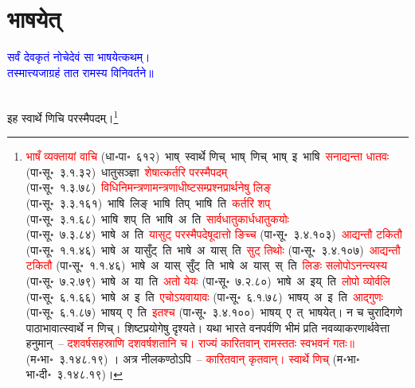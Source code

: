 \section[भाषयेत्]{भाषयेत्}
\centering\textcolor{blue}{सर्वं देवकृतं नोचेदेवं सा भाषयेत्कथम्।\nopagebreak\\
तस्मात्त्यजाग्रहं तात रामस्य विनिवर्तने॥}\nopagebreak\\
\\
\fontsize{14}{21}\selectfont\begin{sloppypar}\justifying\noindent\hspace{10mm} इह स्वार्थे णिचि परस्मैपदम्।\footnote{ \textcolor{red}{भाषँ व्यक्तायां वाचि} (धा॰पा॰~६१२)~\arrow भाष्~\arrow स्वार्थे णिच्~\arrow भाष्~णिच्~\arrow भाष्~इ~\arrow भाषि~\arrow \textcolor{red}{सनाद्यन्ता धातवः} (पा॰सू॰~३.१.३२)~\arrow धातु\-सञ्ज्ञा~\arrow \textcolor{red}{शेषात्कर्तरि परस्मैपदम्} (पा॰सू॰~१.३.७८)~\arrow \textcolor{red}{विधि\-निमन्‍त्रणामन्‍त्रणाधीष्‍ट\-सम्प्रश्‍न\-प्रार्थनेषु लिङ्} (पा॰सू॰~३.३.१६१)~\arrow भाषि~लिङ्~\arrow भाषि~तिप्~\arrow भाषि~ति~\arrow \textcolor{red}{कर्तरि शप्‌} (पा॰सू॰~३.१.६८)~\arrow भाषि~शप्~ति~\arrow भाषि~अ~ति~\arrow \textcolor{red}{सार्वधातुकार्ध\-धातुकयोः} (पा॰सू॰~७.३.८४)~\arrow भाषे~अ~ति~\arrow \textcolor{red}{यासुट् परस्मैपदेषूदात्तो ङिच्च} (पा॰सू॰~३.४.१०३)~\arrow \textcolor{red}{आद्यन्तौ टकितौ} (पा॰सू॰~१.१.४६)~\arrow भाषे~अ~यासुँट्~ति~\arrow भाषे~अ~यास्~ति~\arrow \textcolor{red}{सुट् तिथोः} (पा॰सू॰~३.४.१०७)~\arrow \textcolor{red}{आद्यन्तौ टकितौ} (पा॰सू॰~१.१.४६)~\arrow भाषे~अ~यास्~सुँट्~ति~\arrow भाषे~अ~यास्~स्~ति~\arrow \textcolor{red}{लिङः सलोपोऽनन्त्यस्य} (पा॰सू॰~७.२.७९)~\arrow भाषे~अ~या~ति~\arrow\textcolor{red}{अतो येयः} (पा॰सू॰~७.२.८०)~\arrow भाषे~अ~इय्~ति~\arrow \textcolor{red}{लोपो व्योर्वलि} (पा॰सू॰~६.१.६६)~\arrow भाषे~अ~इ~ति~\arrow \textcolor{red}{एचोऽयवायावः} (पा॰सू॰~६.१.७८)~\arrow भाषय्~अ~इ~ति~\arrow \textcolor{red}{आद्गुणः} (पा॰सू॰~६.१.८७)~\arrow भाषय्~ए~ति~\arrow \textcolor{red}{इतश्च} (पा॰सू॰~३.४.१००)~\arrow भाषय्~ए~त्~\arrow भाषयेत्। न च चुरादिगणे पाठाभावात्स्वार्थे न णिच्। शिष्टप्रयोगेषु दृश्यते। यथा भारते वनपर्वणि भीमं प्रति नव\-व्याकरणार्थ\-वेत्ता हनुमान्~– \textcolor{red}{दशवर्षसहस्राणि दशवर्षशतानि च। राज्यं कारितवान् रामस्ततः स्वभवनं गतः॥} (म॰भा॰~३.१४८.१९) । अत्र नीलकण्ठोऽपि~– \textcolor{red}{कारितवान् कृतवान्। स्वार्थे णिच्} (म॰भा॰ भा॰दी॰~३.१४८.१९)। 
}\end{sloppypar}
